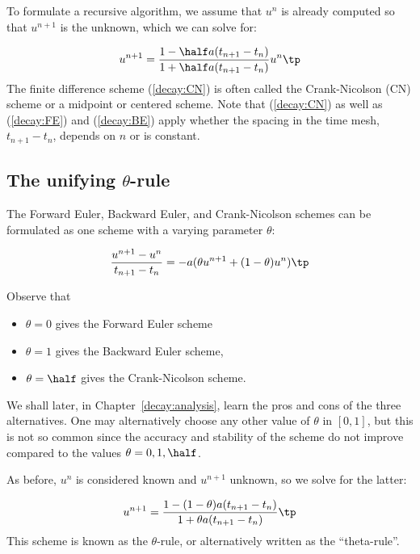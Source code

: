 \documentclass[graybox,sectrefs,envcountresetchap,open=right,final]{svmonodo}
\begin{document}
To formulate a recursive algorithm,
we assume that $u^n$ is already computed so that $u^{n+1}$ is the
unknown, which we can solve for:

\begin{equation}
u^{n+1} = \frac{1-\half a(t_{n+1}-t_n)}{1 + \half a(t_{n+1}-t_n)}u^n\tp
\label{decay:CN}
\end{equation}
The finite difference scheme (\ref{decay:CN}) is often called
the Crank-Nicolson (CN) scheme or a midpoint or centered scheme.
Note that (\ref{decay:CN}) as well as (\ref{decay:FE}) and (\ref{decay:BE})
apply whether the spacing in the time mesh, $t_{n+1}-t_n$, depends on $n$
or is constant.


\subsection{The unifying $\theta$-rule}
\label{decay:schemes:theta}

  

The Forward Euler, Backward Euler, and Crank-Nicolson schemes can be
formulated as one scheme with a varying parameter $\theta$:

\begin{equation}
\frac{u^{n+1}-u^{n}}{t_{n+1}-t_n} = -a (\theta u^{n+1} + (1-\theta) u^{n})
\label{decay:th0}
\tp
\end{equation}

Observe that

\begin{itemize}
 \item $\theta =0$ gives the Forward Euler scheme

 \item $\theta =1$ gives the Backward Euler scheme,

 \item $\theta =\half$ gives the Crank-Nicolson scheme.
\end{itemize}

\noindent
We shall later, in Chapter~\ref{decay:analysis}, learn the pros and cons
of the three alternatives.
One may alternatively choose any other value of $\theta$ in $[0,1]$, but
this is not so common since the accuracy and stability of
the scheme do not improve compared
to the values $\theta=0,1,\half$.

As before, $u^n$ is considered known and $u^{n+1}$ unknown, so
we solve for the latter:

\begin{equation}
u^{n+1} = \frac{1 - (1-\theta) a(t_{n+1}-t_n)}{1 + \theta a(t_{n+1}-t_n)}\tp
\label{decay:th}
\end{equation}
This scheme is known as the $\theta$-rule, or alternatively written as
the ``theta-rule''.
\end{document}
